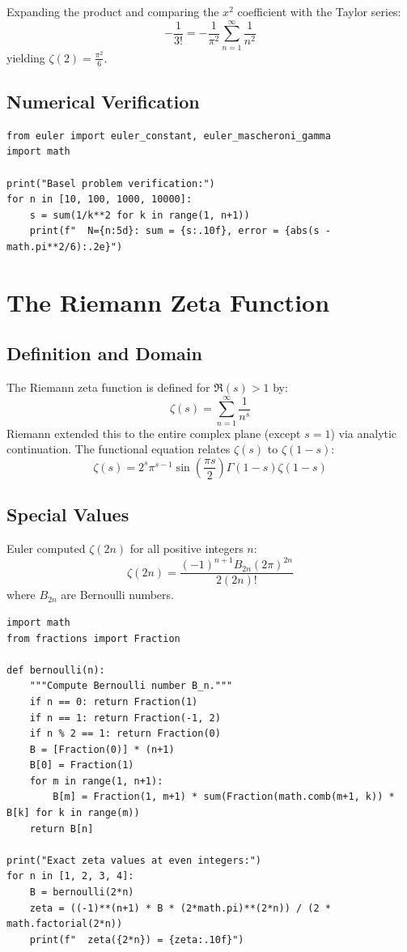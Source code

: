 Expanding the product and comparing the $x^2$ coefficient with the Taylor series:
\[
-\frac{1}{3!} = -\frac{1}{\pi^2} \sum_{n=1}^{\infty} \frac{1}{n^2}
\]
yielding $\zeta(2) = \frac{\pi^2}{6}$.

\subsection{Numerical Verification}

\begin{lstlisting}[caption={Convergence to $\pi^2/6$}, label=lst:basel]
from euler import euler_constant, euler_mascheroni_gamma
import math

print("Basel problem verification:")
for n in [10, 100, 1000, 10000]:
    s = sum(1/k**2 for k in range(1, n+1))
    print(f"  N={n:5d}: sum = {s:.10f}, error = {abs(s - math.pi**2/6):.2e}")
\end{lstlisting}

\section{The Riemann Zeta Function}

\subsection{Definition and Domain}

The Riemann zeta function is defined for $\Re(s) > 1$ by:
\[
\zeta(s) = \sum_{n=1}^{\infty} \frac{1}{n^s}
\]
Riemann extended this to the entire complex plane (except $s = 1$) via analytic continuation.
The functional equation relates $\zeta(s)$ to $\zeta(1-s)$:
\[
\zeta(s) = 2^s \pi^{s-1} \sin\left(\frac{\pi s}{2}\right) \Gamma(1-s) \zeta(1-s)
\]

\subsection{Special Values}

Euler computed $\zeta(2n)$ for all positive integers $n$:
\[
\zeta(2n) = \frac{(-1)^{n+1} B_{2n} (2\pi)^{2n}}{2(2n)!}
\]
where $B_{2n}$ are Bernoulli numbers.

\begin{lstlisting}[caption={Euler's exact zeta values}, label=lst:zeta_even]
import math
from fractions import Fraction

def bernoulli(n):
    """Compute Bernoulli number B_n."""
    if n == 0: return Fraction(1)
    if n == 1: return Fraction(-1, 2)
    if n % 2 == 1: return Fraction(0)
    B = [Fraction(0)] * (n+1)
    B[0] = Fraction(1)
    for m in range(1, n+1):
        B[m] = Fraction(1, m+1) * sum(Fraction(math.comb(m+1, k)) * B[k] for k in range(m))
    return B[n]

print("Exact zeta values at even integers:")
for n in [1, 2, 3, 4]:
    B = bernoulli(2*n)
    zeta = ((-1)**(n+1) * B * (2*math.pi)**(2*n)) / (2 * math.factorial(2*n))
    print(f"  zeta({2*n}) = {zeta:.10f}")
\end{lstlisting}

